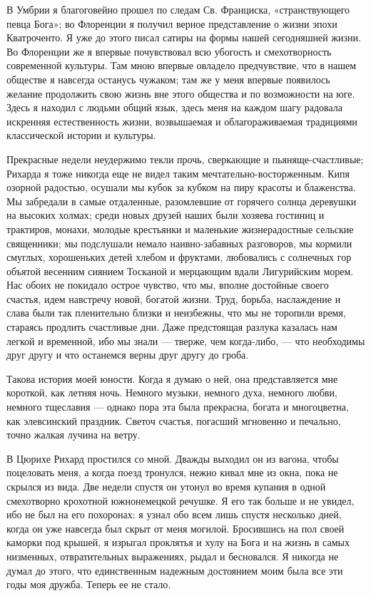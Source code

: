 В   Умбрии   я   благоговейно   прошел  по   следам   Св.   Франциска,
«странствующего   певца  Бога»;   во   Флоренции   я  получил   верное
представление  о  жизни  эпохи  Кватроченто.  Я  уже  до  этого  писал
сатиры на  формы нашей  сегодняшней жизни. Во  Флоренции же  я впервые
почувствовал всю  убогость и смехотворность современной  культуры. Там
мною впервые  овладело предчувствие, что  в нашем обществе  я навсегда
останусь чужаком; там  же у меня впервые  появилось желание продолжить
свою жизнь вне этого общества и по возможности на юге. Здесь я находил
с  людьми общий  язык, здесь  меня на  каждом шагу  радовала искренняя
естественность  жизни,   возвышаемая  и   облагораживаемая  традициями
классической истории и культуры.

Прекрасные    недели   неудержимо    текли    прочь,   сверкающие    и
пьяняще-счастливые;  Рихарда  я  тоже   никогда  еще  не  видел  таким
мечтательно-восторженным. Кипя  озорной радостью, осушали мы  кубок за
кубком на пиру красоты и  блаженства. Мы забредали в самые отдаленные,
разомлевшие  от горячего  солнца  деревушки на  высоких холмах;  среди
новых  друзей  наших  были   хозяева  гостиниц  и  трактиров,  монахи,
молодые крестьянки и маленькие  жизнерадостные сельские священники; мы
подслушали  немало  наивно-забавных  разговоров, мы  кормили  смуглых,
хорошеньких  детей  хлебом  и  фруктами, любовались  с  солнечных  гор
объятой весенним сиянием Тосканой и мерцающим вдали Лигурийским морем.
Нас  обоих  не  покидало  острое чувство,  что  мы,  вполне  достойные
своего  счастья, идем  навстречу новой,  богатой жизни.  Труд, борьба,
наслаждение и слава были так пленительно близки и неизбежны, что мы не
торопили  время, стараясь  продлить счастливые  дни. Даже  предстоящая
разлука казалась нам легкой и временной,  ибо мы знали --- тверже, чем
когда-либо, --- что  необходимы друг другу и что  останемся верны друг
другу до гроба.

Такова история  моей юности. Когда  я думаю о ней,  она представляется
мне короткой, как  летняя ночь. Немного музыки,  немного духа, немного
любви, немного  тщеславия --- однако  пора эта была  прекрасна, богата
и  многоцветна, как  элевсинский  праздник.  Светоч счастья,  погасший
мгновенно и печально, точно жалкая лучина на ветру.

В Цюрихе Рихард простился со мной.  Дважды выходил он из вагона, чтобы
поцеловать меня, а когда поезд тронулся, нежно кивал мне из окна, пока
не скрылся  из вида. Две  недели спустя он  утонул во время  купания в
одной смехотворно крохотной  южнонемецкой речушке. Я его  так больше и
не увидел, ибо не  был на его похоронах: я узнал  обо всем лишь спустя
несколько  дней, когда  он уже  навсегда  был скрыт  от меня  могилой.
Бросившись на пол своей каморки под крышей, я изрыгал проклятья и хулу
на Бога и на жизнь в самых низменных, отвратительных выражениях, рыдал
и бесновался. Я  никогда не думал до этого,  что единственным надежным
достоянием моим была все эти годы моя дружба. Теперь ее не стало.


